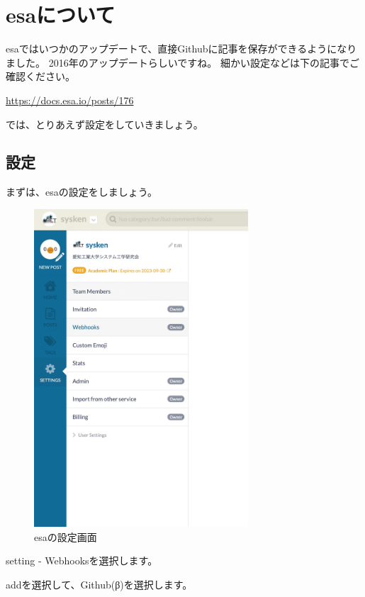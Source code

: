 \chapter{esaについて}

esaではいつかのアップデートで、直接Githubに記事を保存ができるようになりました。
2016年のアップデートらしいですね。
細かい設定などは下の記事でご確認ください。

\url{https://docs.esa.io/posts/176}

では、とりあえず設定をしていきましょう。

\section{設定}

  まずは、esaの設定をしましょう。
  
  \begin{figure}[H]
    \centering
    \includegraphics[width=8cm]{./image/02-chap7/esa-setting.png}
    \caption{esaの設定画面}
    \label{chap7-esa-setting-image}
  \end{figure}

  setting - Webhooksを選択します。

  addを選択して、Github(β)を選択します。 

